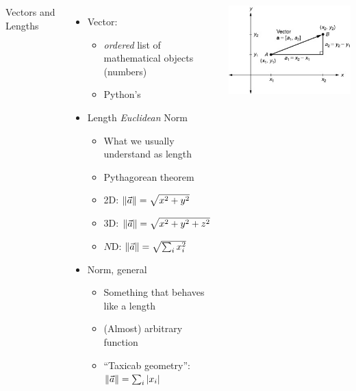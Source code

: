 \begin{frame}
%
\begin{columns}[T]
\begin{Large}
	{Vectors and Lengths}
	\vspace{6pt}
\end{Large}
%
\begin{itemize}
\item Vector:
	\begin{itemize}
	\item \emph{ordered} list of mathematical objects (numbers)
	\item Python's 
	\end{itemize}
\item Length \emph{Euclidean} Norm
	\begin{itemize}
	\item What we usually understand as length
	\item Pythagorean theorem
	\item 2D: $\norm{\vec{a}} = \sqrt{x^2 + y^2}$
	\item 3D: $\norm{\vec{a}} = \sqrt{x^2 + y^2 + z^2}$
	\item $N$D: $\norm{\vec{a}} = \sqrt{\sum_i x_i^2}$
	\end{itemize}
\item Norm, general
	\begin{itemize}
	\item Something that behaves like a length
	\item (Almost) arbitrary function
	\item \enquote{Taxicab geometry}: $\norm{\vec{a}} = \sum_i \abs{x_i}$
	\end{itemize}
\end{itemize}
%
\begin{center}
	\tiny
	\includegraphics[width=\linewidth]{./gfx/pythagoras-2d}

\end{center}
\end{columns}
\end{frame}
